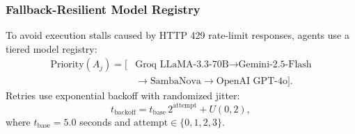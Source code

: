 \documentclass[conference]{IEEEtran}
\begin{document}
\subsubsection{Fallback-Resilient Model Registry}
To avoid execution stalls caused by HTTP 429 rate-limit responses, agents use a tiered model registry:
\begin{equation}
\begin{aligned}
\mathrm{Priority}(A_j)= [&\text{Groq LLaMA-3.3-70B}\rightarrow
\text{Gemini-2.5-Flash}\\
&\rightarrow\text{SambaNova}\rightarrow\text{OpenAI GPT-4o}].
\end{aligned}
\label{eq:models}
\end{equation}
Retries use exponential backoff with randomized jitter:
\begin{equation}
t_{\mathrm{backoff}}=
t_{\mathrm{base}}\,2^{\mathrm{attempt}}+U(0,2),
\label{eq:backoff}
\end{equation}
where $t_{\mathrm{base}}=5.0$ seconds and
$\mathrm{attempt}\in\{0,1,2,3\}$.
\end{document}

